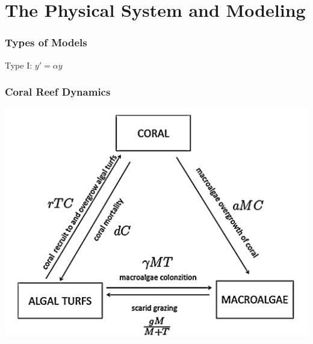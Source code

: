 
\section{The Physical System and Modeling}

\begin{frame}
  \frametitle{Types of Models}
   Type I: $y'=\alpha y$\\
\end{frame}

\begin{frame}
\frametitle{Coral Reef Dynamics}
\includegraphics[natwidth=162bp,natheight=227bp,width=280bp]{./coral-reef-triangle.png}
\end{frame}

